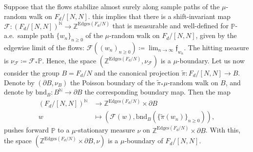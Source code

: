 \documentclass[reqno,oneside,11pt]{amsart}
\newcommand{\Z}{\mathbb{Z}}
\renewcommand{\P}{\mathbb{P}}
\theoremstyle{plain}
\newtheorem{lem}[thm]{Lemma}
\theoremstyle{definition}
\begin{document}
Suppose that the flows stabilize almost surely along sample paths of the $\mu$-random walk on $F_d/[N,N]$. this implies that there is a shift-invariant map $\mathcal{F}:(F_d/[N,N])^{\mathbb{N}}\to \Z^{\mathrm{Edges}(F_d/N)}$ that is measurable and well-defined for $\P$-a.e.\ sample path $\{w_n\}_{n\ge 0}$ of the $\mu$-random walk on $F_d/[N,N]$, given by the edgewise limit of the flows:
\(
\mathcal{F}((w_n)_{n\ge 0})\coloneqq \lim_{n\to \infty} \mathfrak{f}_{w_n}.
\) 
The hitting measure is $\nu_{\mathcal{F}}\coloneqq \mathcal{F}_{*}\P$. Hence, the space $(\Z^{\mathrm{Edges}(F_d/N)},\nu_{\mathcal{F}})$ is a $\mu$-boundary. Let us now consider the group $B=F_d/N$ and the canonical projection $\widetilde{\pi}:F_d/[N,N]\to B$. Denote by $(\partial B,\nu_B)$ the Poisson boundary of the $\widetilde{\pi}_{*}\mu$-random walk on $B$, and denote by $\mathrm{bnd}_B:B^{\mathbb{N}}\to \partial B$ the corresponding boundary map. Then the map
\begin{align*}
		\left(F_d/[N,N]\right)^{\mathbb{N}}&\to \Z^{\mathrm{Edges}(F_d/N) } \times \partial B\\
		w&\mapsto \left(\mathcal{F}(w), \mathrm{bnd}_B\left( \{\widetilde{\pi}(w_n)\}_{n\ge 0} \right) \right),
\end{align*}
pushes forward $\P$ to a $\mu$-stationary measure $\nu$ on $ \Z^{\mathrm{Edges}(F_d/N)}\times \partial B$. With this, the space $( \Z^{\mathrm{Edges}(F_d/N)}\times \partial B,\nu)$ is a $\mu$-boundary of $F_d/[N,N]$.
\end{document}
